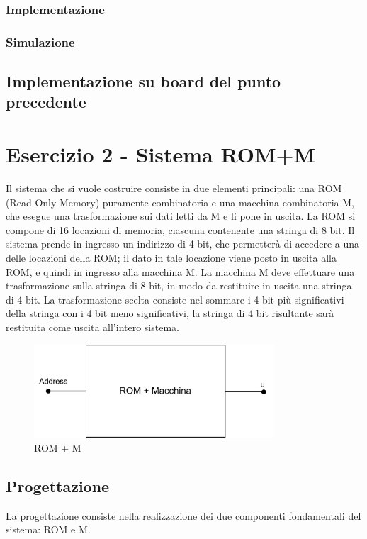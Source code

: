 \subsection{Implementazione}
\subsection{Simulazione}
\section{Implementazione su board del punto precedente}

\chapter{Esercizio 2 - Sistema ROM+M}
Il sistema che si vuole costruire consiste in due elementi principali: una ROM (Read-Only-Memory) puramente combinatoria e una macchina combinatoria M, che esegue una trasformazione sui dati letti da M e li pone in uscita. La ROM si compone di 16 locazioni di memoria, ciascuna contenente una stringa di 8 bit. Il sistema prende in ingresso un indirizzo di 4 bit, che permetterà di accedere a una delle locazioni della ROM; il dato in tale locazione viene posto in uscita alla ROM, e quindi in ingresso alla macchina M. La macchina M deve effettuare una trasformazione sulla stringa di 8 bit, in modo da restituire in uscita una stringa di 4 bit. La trasformazione scelta consiste nel sommare i 4 bit più significativi della stringa con i 4 bit meno significativi, la stringa di 4 bit risultante sarà restituita come uscita all'intero sistema.
\begin{figure}[H]
	\centering
	\includegraphics[width=0.8\textwidth]{img/rom_M_black_box}
	\caption{ROM + M}
	\label{Rom_M} 
\end{figure}
\section{Progettazione}
La progettazione consiste nella realizzazione dei due componenti fondamentali del sistema: ROM e M. 
